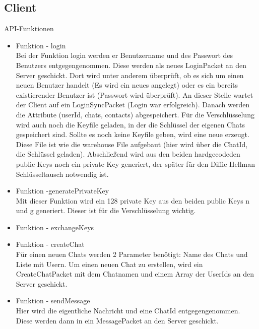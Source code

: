 \subsection{Client}
API-Funktionen
\begin{itemize}
    \item Funktion - login\\
    Bei der Funktion login werden er Benutzername und des Passwort des Benutzers entgegengenommen. Diese werden als
    neues LoginPacket an den Server geschickt. Dort wird unter anderem überprüft, ob es sich um einen neuen Benutzer
    handelt (Es wird ein neues angelegt) oder es ein bereits existierender Benutzer ist (Passwort wird überprüft).
    An dieser Stelle wartet der Client auf ein LoginSyncPacket (Login war erfolgreich). Danach werden die
    Attribute (userId, chats, contacts) abgespeichert. Für die Verschlüsselung wird auch noch die Keyfile geladen,
    in der die Schlüssel der eigenen Chats gespeichert sind. Sollte es noch keine Keyfile geben, wird eine neue
    erzeugt. Diese File ist wie die warehouse File aufgebaut (hier wird über die ChatId, die Schlüssel geladen).
    Abschließend wird aus den beiden hardgecodeden public Keys noch ein private Key generiert, der später für den
    Diffie Hellman Schlüsseltausch notwendig ist.
    
    \item Funktion -generatePrivateKey\\
    Mit dieser Funktion wird ein 128 private Key aus den beiden public Keys n und g generiert. Dieser ist für die
    Verschlüsselung wichtig.
    
    \item Funktion - exchangeKeys\\
    \item Funktion - createChat\\
    Für einen neuen Chats werden 2 Parameter benötigt: Name des Chats und Liste mit Usern. Um einen neuen Chat zu
    erstellen, wird ein CreateChatPacket mit dem Chatnamen und einem Array der UserIds an den Server geschickt.
    
    \item Funktion - sendMessage\\
    Hier wird die eigentliche Nachricht und eine ChatId entgegengenommen. Diese werden dann in ein MessagePacket an
    den Server geschickt.

\end{itemize}
